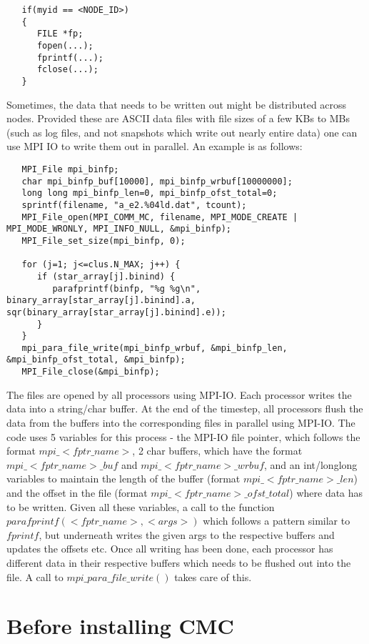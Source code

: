 \documentclass[11pt]{article}
\begin{document}
\begin{lstlisting}
   if(myid == <NODE_ID>)
   {
      FILE *fp;
      fopen(...);
      fprintf(...);
      fclose(...);
   }
\end{lstlisting}

Sometimes, the data that needs to be written out might be distributed across nodes. Provided these are ASCII data files with file sizes of a few KBs to MBs (such as log files, and not snapshots which write out nearly entire data) one can use MPI IO to write them out in parallel. An example is as follows:

\begin{lstlisting}
   MPI_File mpi_binfp;
   char mpi_binfp_buf[10000], mpi_binfp_wrbuf[10000000];
   long long mpi_binfp_len=0, mpi_binfp_ofst_total=0;
   sprintf(filename, "a_e2.%04ld.dat", tcount);
   MPI_File_open(MPI_COMM_MC, filename, MPI_MODE_CREATE | MPI_MODE_WRONLY, MPI_INFO_NULL, &mpi_binfp);
   MPI_File_set_size(mpi_binfp, 0);

   for (j=1; j<=clus.N_MAX; j++) {
      if (star_array[j].binind) {
         parafprintf(binfp, "%g %g\n", binary_array[star_array[j].binind].a, sqr(binary_array[star_array[j].binind].e));
      }
   }
   mpi_para_file_write(mpi_binfp_wrbuf, &mpi_binfp_len, &mpi_binfp_ofst_total, &mpi_binfp);
   MPI_File_close(&mpi_binfp);
\end{lstlisting}

The files are opened by all processors using MPI-IO. Each processor writes the data into a string/char buffer. At the end of the timestep, all processors flush the data from the buffers into the corresponding files in parallel using MPI-IO. The code uses 5 variables for this process - the MPI-IO file pointer, which follows the format $mpi\_<fptr\_name>$, 2 char buffers, which have the format $mpi\_<fptr\_name>\_buf$ and $mpi\_<fptr\_name>\_wrbuf$, and an int/longlong variables to maintain the length of the buffer (format $mpi\_<fptr\_name>\_len$) and the offset in the file (format $mpi\_<fptr\_name>\_ofst\_total$) where data has to be written. Given all these variables, a call to the function $parafprintf(<fptr\_name>, <args>)$ which follows a pattern similar to $fprintf$, but underneath writes the given args to the respective buffers and updates the offsets etc. Once all writing has been done, each processor has different data in their respective buffers which needs to be flushed out into the file. A call to $mpi\_para\_file\_write()$ takes care of this.


\section{Before installing CMC}
\end{document}
